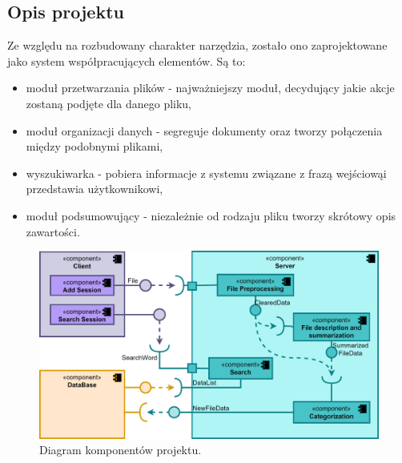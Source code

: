 \documentclass[12pt,a4paper,twoside]{article}
\begin{document}
\subsection{Opis projektu}
Ze względu na rozbudowany charakter narzędzia, zostało ono zaprojektowane jako system współpracujących elementów. Są to:
\begin{itemize}
	\item moduł przetwarzania plików - najważniejszy moduł, decydujący jakie akcje zostaną podjęte dla danego pliku,
	\item moduł organizacji danych - segreguje dokumenty oraz tworzy połączenia między podobnymi plikami,
	\item wyszukiwarka - pobiera informacje z systemu związane z frazą wejściową\break i przedstawia użytkownikowi,
	\item moduł podsumowujący - niezależnie od rodzaju pliku tworzy skrótowy opis zawartości.
\end{itemize}\par
\begin{figure}[h!]
\centering
  \includegraphics[width=\textwidth]{img/component.pdf}
  \caption{Diagram komponentów projektu.}
\end{figure}
\end{document}
